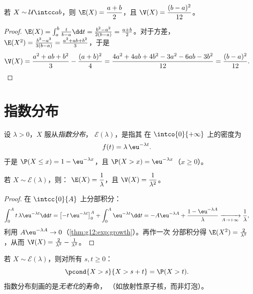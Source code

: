 \begin{proposition}\label{prop:g12:contdist:uniformmoments}
若 $X \sim \mathcal U\intcc ab$，则
$\E(X) = \dfrac{a+b}{2}$，且 $\V(X) = \dfrac{(b-a)^2}{12}$。
\end{proposition}

\begin{proof}
$\E(X) = \int_a^b \frac{t}{b-a}\dd t
= \frac{b^2 - a^2}{2(b-a)} = \frac{a+b}{2}$。对于方差，
$\E(X^2) = \frac{b^3 - a^3}{3(b-a)} = \frac{a^2 + ab + b^2}{3}$，于是
\[
\V(X) = \frac{a^2 + ab + b^2}{3} - \frac{(a+b)^2}{4}
= \frac{4a^2 + 4ab + 4b^2 - 3a^2 - 6ab - 3b^2}{12}
= \frac{(b - a)^2}{12}. \qedhere
\]
\end{proof}

\section{指数分布}

\begin{definition}[指数分布]\label{def:g12:contdist:expo}
设 $\lambda > 0$，$X$ 服从\emph{指数分布}，
$\mathcal E(\lambda)$，是指其
在 $\intco{0}{+\infty}$ 上的密度为
\[
f(t) = \lambda\,\eu^{-\lambda t}.
\]
于是 $\P(X \leq x) = 1 - \eu^{-\lambda x}$，且
$\P(X > x) = \eu^{-\lambda x}$（$x \geq 0$）。
\end{definition}

\begin{proposition}\label{prop:g12:contdist:expomoments}
若 $X \sim \mathcal E(\lambda)$，则：
$\E(X) = \dfrac{1}{\lambda}$，且 $\V(X) = \dfrac{1}{\lambda^2}$。
\end{proposition}

\begin{proof}
在 $\intcc{0}{A}$ 上分部积分：
\[
\int_0^A t\,\lambda\eu^{-\lambda t}\dd t
= \bigl[-t\,\eu^{-\lambda t}\bigr]_0^A + \int_0^A \eu^{-\lambda t}\dd t
= -A\eu^{-\lambda A} + \frac{1 - \eu^{-\lambda A}}{\lambda}
\xrightarrow[A\to+\infty]{} \frac1\lambda,
\]
利用 $A\eu^{-\lambda A} \to 0$（\cref{thm:g12:exp:growth}）。再作一次
分部积分得 $\E(X^2) = \frac{2}{\lambda^2}$，从而
$\V(X) = \frac{2}{\lambda^2} - \frac{1}{\lambda^2}$。
\end{proof}

\begin{theorem}[无记忆性]\label{thm:g12:contdist:memoryless}
若 $X \sim \mathcal E(\lambda)$，则对所有 $s, t \geq 0$：
\[
\pcond{X > s}{X > s + t} = \P(X > t) .
\]
指数分布刻画的是\emph{无老化}的寿命，
（如放射性原子核，而非灯泡）。
\end{theorem}

